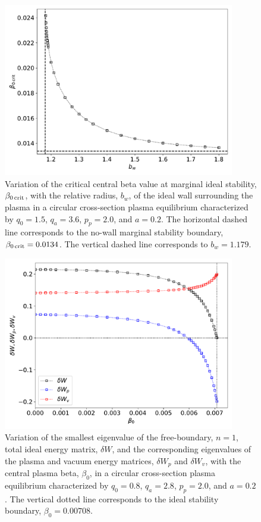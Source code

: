 \documentclass[12pt,prb,aps]{revtex4-1}
\begin{document}
\begin{figure}
\centerline{\includegraphics[width=0.9\textwidth]{Fig13.pdf}}
\caption{Variation of the critical central beta value at marginal ideal stability, $\beta_{0\,{\rm crit}}$, with the relative radius, $b_w$, of the ideal wall surrounding the plasma in 
a circular cross-section plasma equilibrium characterized by $q_0=1.5$, $q_a= 3.6$, $p_p=2.0$, and
$a=0.2$. The horizontal dashed line corresponds to the no-wall  marginal stability boundary, $\beta_{0\,{\rm crit}}=0.0134$. The vertical dashed line corresponds to $b_w=1.179$.  \label{fig13}}
\end{figure}

\begin{figure}
\centerline{\includegraphics[width=0.9\textwidth]{Fig14.pdf}}
\caption{Variation of the smallest eigenvalue of the free-boundary, $n=1$, total ideal energy matrix, $\delta W$, and the corresponding eigenvalues of the plasma and vacuum energy matrices, 
$\delta W_p$ and $\delta W_v$, with the central plasma beta, $\beta_0$, in a circular cross-section plasma equilibrium characterized by $q_0=0.8$, $q_a= 2.8$, $p_p=2.0$, and
$a=0.2$. The vertical dotted line corresponds to the ideal stability boundary, $\beta_0=0.00708$.  \label{fig14}}
\end{figure}
\end{document}
